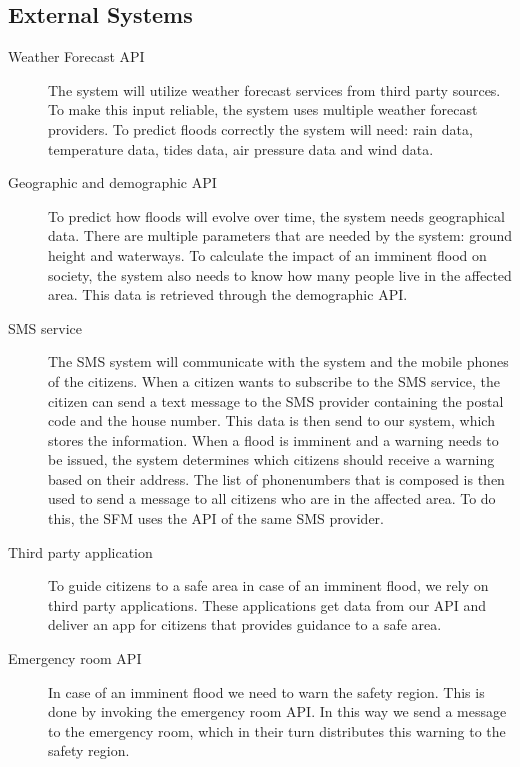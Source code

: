 \subsection{External Systems}
\begin{description}
	\item[Weather Forecast API] The system will utilize weather forecast services from third party sources. To make this input reliable, the system uses multiple weather forecast providers. To predict floods correctly the system will need: rain data, temperature data, tides data, air pressure data and wind data.
	\item[Geographic and demographic API] To predict how floods will evolve over time, the system needs geographical data. There are multiple parameters that are needed by the system: ground height and waterways. To calculate the impact of an imminent flood on society, the system also needs to know how many people live in the affected area. This data is retrieved through the demographic API.
	\item[SMS service] The SMS system will communicate with the system and the mobile phones of the citizens. When a citizen wants to subscribe to the SMS service, the citizen can send a text message to the SMS provider containing the postal code and the house number. This data is then send to our system, which stores the information. When a flood is imminent and a warning needs to be issued, the system determines which citizens should receive a warning based on their address. The list of phonenumbers that is composed is then used to send a message to all citizens who are in the affected area. To do this, the SFM uses the API of the same SMS provider.
	\item[Third party application] To guide citizens to a safe area in case of an imminent flood, we rely on third party applications. These applications get data from our API and deliver an app for citizens that provides guidance to a safe area.
	\item[Emergency room API] In case of an imminent flood we need to warn the safety region. This is done by invoking the emergency room API. In this way we send a message to the emergency room, which in their turn distributes this warning to the safety region.
\end{description}

